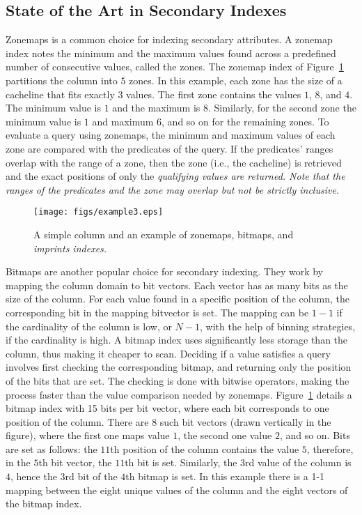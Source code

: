 \subsection{State of the Art in Secondary Indexes}

Zonemaps is a common choice for indexing secondary attributes. A zonemap index
notes the minimum and the maximum values found across a predefined number of
consecutive values, called the zones. The zonemap index of
Figure~\ref{fig:example} partitions the column into $5$ zones. In this example,
each zone has the size of a cacheline that fits exactly $3$ values. The first
zone contains the values $1$, $8$, and $4$. The minimum value is $1$ and the
maximum is $8$. Similarly, for the second zone the minimum value is $1$ and
maximum $6$, and so on for the remaining zones. To evaluate a query using
zonemaps, the minimum and maximum values of each zone are compared with the
predicates of the query. If the predicates' ranges overlap with the range of
a zone, then the zone (i.e., the cacheline) is retrieved and the
exact positions of only the \it{qualifying} values are returned. Note that the
ranges of the predicates and the zone may overlap but not be strictly
inclusive.

\begin{figure}
\centering\texttt{[image: figs/example3.eps]}
\caption{A simple column and an example of zonemaps, bitmaps, and \it{imprints} indexes.}
\label{fig:example}
\end{figure}

Bitmaps are another popular choice for secondary indexing. They work by
mapping the column domain to bit vectors. Each vector has as many bits as the
size of the column. For each value found in a specific position of the column,
the corresponding bit in the mapping bitvector is set. The mapping can be $1-1$
if the cardinality of the column is low, or $N-1$, with the help of binning
strategies, if the cardinality is high. A bitmap index uses significantly less
storage than the column, thus making it cheaper to scan. Deciding if a value
satisfies a query involves first checking the corresponding
bitmap, and returning only the position of the bits that are set. The checking
is done with bitwise operators, making the process faster than the value
comparison needed by zonemaps. Figure~\ref{fig:example} details a bitmap index
with 15 bits per bit vector, where each bit corresponds to one position of the
column. There are 8 such bit vectors (drawn vertically in the figure), where
the first one maps value $1$, the second one value $2$, and so on. Bits
are set as follows: the $11$th position of the column contains the value $5$,
therefore, in the $5$th bit vector, the $11$th bit is set. Similarly, the
$3$rd value of the column is $4$, hence the $3$rd bit of the $4$th bitmap is
set. In this example there is a 1-1 mapping between the eight unique values of
the column and the eight vectors of the bitmap index.

